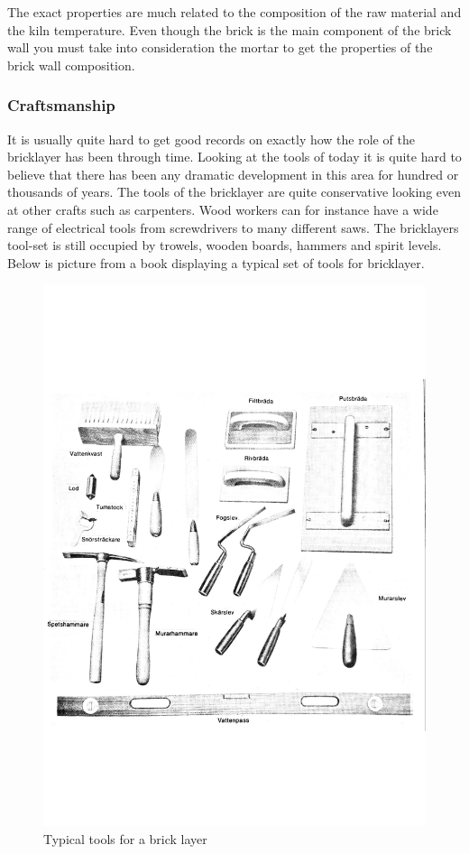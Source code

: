 The exact properties are much related to the composition of the raw material and the kiln temperature. Even though the brick is the main component of the brick wall you must take into consideration the mortar to get the properties of the brick wall composition.

\subsubsection{Craftsmanship}

It is usually quite hard to get good records on exactly how the role of the bricklayer has been through time. Looking at the tools of today it is quite hard to believe that there has been any dramatic development in this area for hundred or thousands of years. The tools of the bricklayer are quite conservative looking even at other crafts such as carpenters. Wood workers can for instance have a wide range of electrical tools from screwdrivers to many different saws. The bricklayers tool-set is still occupied by trowels, wooden boards, hammers and spirit levels. Below is picture from a book displaying a typical set of tools for bricklayer.

\begin{figure}[H]
\centering
\includegraphics[width=0.8\linewidth ]{figure/Theory/tools.pdf}
\caption{Typical tools for a brick layer}
\end{figure}

